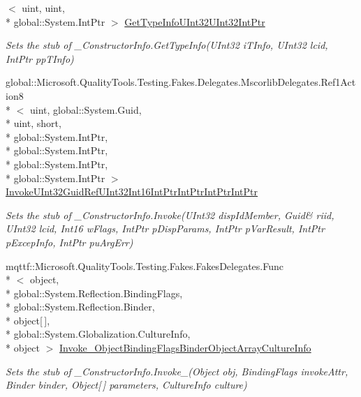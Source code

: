\begin{DoxyCompactItemize}
$<$ uint, uint, \\*
global\-::\-System.\-Int\-Ptr $>$ \hyperlink{class_system_1_1_runtime_1_1_interop_services_1_1_fakes_1_1_stub___constructor_info_aaddcb8694c64ce14c8774edcdab67e00}{Get\-Type\-Info\-U\-Int32\-U\-Int32\-Int\-Ptr}
\begin{DoxyCompactList}\small\item\em Sets the stub of \-\_\-\-Constructor\-Info.\-Get\-Type\-Info(\-U\-Int32 i\-T\-Info, U\-Int32 lcid, Int\-Ptr pp\-T\-Info)\end{DoxyCompactList}\item 
global\-::\-Microsoft.\-Quality\-Tools.\-Testing.\-Fakes.\-Delegates.\-Mscorlib\-Delegates.\-Ref1\-Action8\\*
$<$ uint, global\-::\-System.\-Guid, \\*
uint, short, \\*
global\-::\-System.\-Int\-Ptr, \\*
global\-::\-System.\-Int\-Ptr, \\*
global\-::\-System.\-Int\-Ptr, \\*
global\-::\-System.\-Int\-Ptr $>$ \hyperlink{class_system_1_1_runtime_1_1_interop_services_1_1_fakes_1_1_stub___constructor_info_af916e71f4143e6e6b5af2fbc806e72c1}{Invoke\-U\-Int32\-Guid\-Ref\-U\-Int32\-Int16\-Int\-Ptr\-Int\-Ptr\-Int\-Ptr\-Int\-Ptr}
\begin{DoxyCompactList}\small\item\em Sets the stub of \-\_\-\-Constructor\-Info.\-Invoke(U\-Int32 disp\-Id\-Member, Guid\& riid, U\-Int32 lcid, Int16 w\-Flags, Int\-Ptr p\-Disp\-Params, Int\-Ptr p\-Var\-Result, Int\-Ptr p\-Excep\-Info, Int\-Ptr pu\-Arg\-Err)\end{DoxyCompactList}\item 
mqttf\-::\-Microsoft.\-Quality\-Tools.\-Testing.\-Fakes.\-Fakes\-Delegates.\-Func\\*
$<$ object, \\*
global\-::\-System.\-Reflection.\-Binding\-Flags, \\*
global\-::\-System.\-Reflection.\-Binder, \\*
object\mbox{[}$\,$\mbox{]}, \\*
global\-::\-System.\-Globalization.\-Culture\-Info, \\*
object $>$ \hyperlink{class_system_1_1_runtime_1_1_interop_services_1_1_fakes_1_1_stub___constructor_info_a6488bd51e3d178e73b909cd5f20f26a7}{Invoke\-\_\-Object\-Binding\-Flags\-Binder\-Object\-Array\-Culture\-Info}
\begin{DoxyCompactList}\small\item\em Sets the stub of \-\_\-\-Constructor\-Info.\-Invoke\-\_(\-Object obj, Binding\-Flags invoke\-Attr, Binder binder, Object\mbox{[}$\,$\mbox{]} parameters, Culture\-Info culture)\end{DoxyCompactList}\item 

\end{DoxyCompactItemize}
